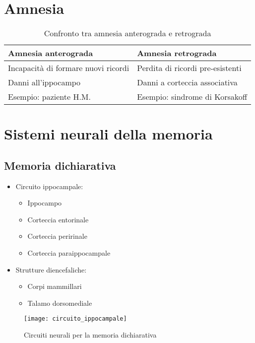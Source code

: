 \documentclass[11pt]{article}
\begin{document}
\section*{Amnesia}

\begin{table}[h]
\centering
\caption{Confronto tra amnesia anterograda e retrograda}
\begin{tabular}{p{7cm}p{7cm}}
\toprule
\textbf{Amnesia anterograda} & \textbf{Amnesia retrograda} \\
\midrule
Incapacità di formare nuovi ricordi & Perdita di ricordi pre-esistenti \\
Danni all'ippocampo & Danni a corteccia associativa \\
Esempio: paziente H.M. & Esempio: sindrome di Korsakoff \\
\bottomrule
\end{tabular}
\end{table}

\section*{Sistemi neurali della memoria}

\subsection*{Memoria dichiarativa}
\begin{itemize}
    \item Circuito ippocampale:
    \begin{itemize}
        \item Ippocampo
        \item Corteccia entorinale
        \item Corteccia peririnale
        \item Corteccia paraippocampale
    \end{itemize}
    \item Strutture diencefaliche:
    \begin{itemize}
        \item Corpi mammillari
        \item Talamo dorsomediale
    \end{itemize}
\end{itemize}

\begin{figure}[h]
    \centering
    \texttt{[image: circuito\_ippocampale]} %
    \caption{Circuiti neurali per la memoria dichiarativa}
    \label{fig:circuito}
\end{figure}
\end{document}
